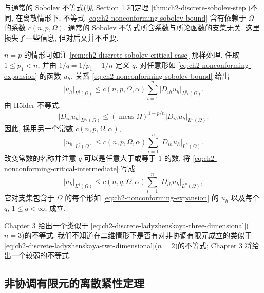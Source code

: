 \hypertarget{chapter-02-page-146}{}
\begin{Remark}
\label{rem:ch2-nonconforming-domain-constant}
与通常的 Sobolev 不等式(见 Section 1 和定理 \ref{thm:ch2-discrete-sobolev-step})不同, 在离散情形下, 不等式 \eqref{eq:ch2-nonconforming-sobolev-bound} 含有依赖于 $\Omega$ 的系数 $c(n,p,\Omega)$. 通常的 Sobolev 不等式所含系数与所论函数的支集无关. 这里损失了一些信息, 但对后文并不重要.
\end{Remark}

\begin{Remark}
\label{rem:ch2-nonconforming-critical-case}
$n=p$ 的情形可如注 \ref{rem:ch2-discrete-sobolev-critical-case} 那样处理. 任取 $1\leq p_1<n$, 并由 $1/q=1/p_1-1/n$ 定义 $q$. 对任意形如 \eqref{eq:ch2-nonconforming-expansion} 的函数 $u_h$, 关系 \eqref{eq:ch2-nonconforming-sobolev-bound} 给出
\[
|u_h|_{L^q(\Omega)}
\leq c(n,p,\Omega,\alpha)
\sum_{i=1}^{n}|D_{ih}u_h|_{L^{p_1}(\Omega)}.
\]
由 Hölder 不等式,
\[
|D_{ih}u_h|_{L^{p_1}(\Omega)}
\leq(\operatorname{meas}\Omega)^{1-p/n}|D_{ih}u_h|_{L^n(\Omega)}.
\]
因此, 换用另一个常数 $c(n,p,\Omega,\alpha)$,
\begin{equation}
|u_h|_{L^q(\Omega)}
\leq c(n,p,\Omega,\alpha)
\sum_{i=1}^{n}|D_{ih}u_h|_{L^n(\Omega)}.
\label{eq:ch2-nonconforming-critical-intermediate}
\end{equation}
改变常数的名称并注意 $q$ 可以是任意大于或等于 $1$ 的数, 将 \eqref{eq:ch2-nonconforming-critical-intermediate} 写成
\begin{equation}
|u_h|_{L^q(\Omega)}
\leq c(n,q,\Omega,\alpha)
\sum_{i=1}^{n}|D_{ih}u_h|_{L^n(\Omega)},
\label{eq:ch2-nonconforming-critical-bound}
\end{equation}
它对支集包含于 $\Omega$ 的每个形如 \eqref{eq:ch2-nonconforming-expansion} 的 $u_h$ 以及每个 $q$, $1\leq q<\infty$, 成立.
\end{Remark}

\begin{Remark}
\label{rem:ch2-nonconforming-ladyzhenskaya}
Chapter 3 给出一个类似于 \eqref{eq:ch2-discrete-ladyzhenskaya-three-dimensional}($n=3$)的不等式. 我们不知道在二维情形下是否有对非协调有限元成立的类似于 \eqref{eq:ch2-discrete-ladyzhenskaya-two-dimensional}($n=2$)的不等式; Chapter 3 将给出一个较弱的不等式.
\end{Remark}

\subsection{非协调有限元的离散紧性定理}
\label{subsec:ch2-discrete-compactness-nonconforming}


